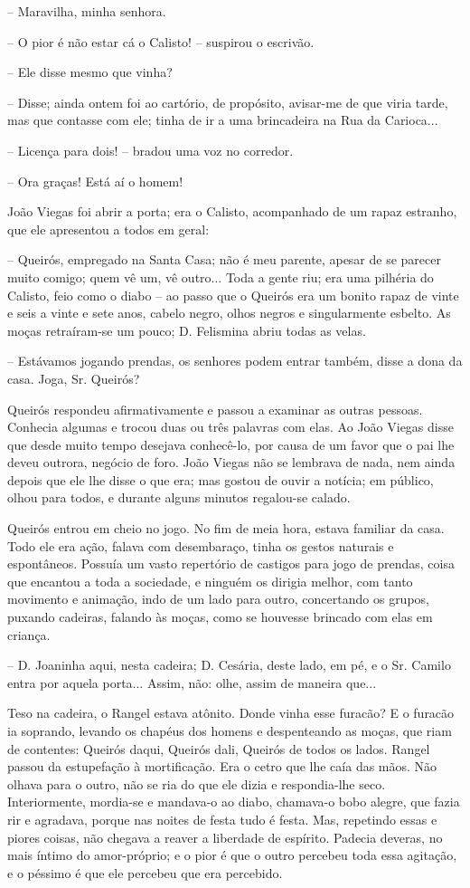 -- Maravilha, minha senhora.

-- O pior é não estar cá o Calisto! -- suspirou o escrivão.

-- Ele disse mesmo que vinha?

-- Disse; ainda ontem foi ao cartório, de propósito, avisar-me de que
viria tarde, mas que contasse com ele; tinha de ir a uma brincadeira na
Rua da Carioca...

-- Licença para dois! -- bradou uma voz no corredor.

-- Ora graças! Está aí o homem!

João Viegas foi abrir a porta; era o Calisto, acompanhado de um rapaz
estranho, que ele apresentou a todos em geral:

-- Queirós, empregado na Santa Casa; não é meu parente, apesar de se
parecer muito comigo; quem vê um, vê outro... Toda a gente riu; era uma
pilhéria do Calisto, feio como o diabo -- ao passo que o Queirós era um
bonito rapaz de vinte e seis a vinte e sete anos, cabelo negro, olhos
negros e singularmente esbelto. As moças retraíram-se um pouco; D.
Felismina abriu todas as velas.

-- Estávamos jogando prendas, os senhores podem entrar também, disse a
dona da casa. Joga, Sr. Queirós?

Queirós respondeu afirmativamente e passou a examinar as outras pessoas.
Conhecia algumas e trocou duas ou três palavras com elas. Ao João Viegas
disse que desde muito tempo desejava conhecê-lo, por causa de um favor
que o pai lhe deveu outrora, negócio de foro. João Viegas não se
lembrava de nada, nem ainda depois que ele lhe disse o que era; mas
gostou de ouvir a notícia; em público, olhou para todos, e durante
alguns minutos regalou-se calado.

Queirós entrou em cheio no jogo. No fim de meia hora, estava familiar da
casa. Todo ele era ação, falava com desembaraço, tinha os gestos
naturais e espontâneos. Possuía um vasto repertório de castigos para
jogo de prendas, coisa que encantou a toda a sociedade, e ninguém os
dirigia melhor, com tanto movimento e animação, indo de um lado para
outro, concertando os grupos, puxando cadeiras, falando às moças, como
se houvesse brincado com elas em criança.

-- D. Joaninha aqui, nesta cadeira; D. Cesária, deste lado, em pé, e o
Sr. Camilo entra por aquela porta... Assim, não: olhe, assim de maneira
que...

Teso na cadeira, o Rangel estava atônito. Donde vinha esse furacão? E o
furacão ia soprando, levando os chapéus dos homens e despenteando as
moças, que riam de contentes: Queirós daqui, Queirós dali, Queirós de
todos os lados. Rangel passou da estupefação à mortificação. Era o cetro
que lhe caía das mãos. Não olhava para o outro, não se ria do que ele
dizia e respondia-lhe seco. Interiormente, mordia-se e mandava-o ao
diabo, chamava-o bobo alegre, que fazia rir e agradava, porque nas
noites de festa tudo é festa. Mas, repetindo essas e piores coisas, não
chegava a reaver a liberdade de espírito. Padecia deveras, no mais
íntimo do amor-próprio; e o pior é que o outro percebeu toda essa
agitação, e o péssimo é que ele percebeu que era percebido.

